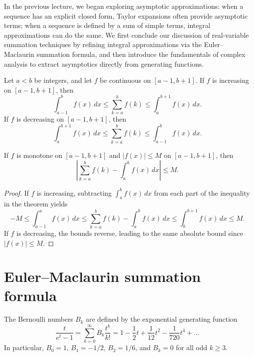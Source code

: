 
In the previous lecture, we began exploring asymptotic approximations:
when a sequence has an explicit closed form, Taylor expansions often provide asymptotic terms;
when a sequence is defined by a sum of simple terms, integral approximations can do the same.
We first conclude our discussion of real-variable summation techniques by refining integral approximations via the Euler--Maclaurin summation formula, and then introduce the fundamentals of complex analysis to extract asymptotics directly from generating functions.

\begin{theorem}
    Let \(a < b\) be integers, and let \(f\) be continuous on \([a-1, b+1]\).
    If \(f\) is increasing on \([a-1, b+1]\), then
    \[
        \int_{a-1}^{b} f(x) \, dx \le \sum_{k=a}^{b} f(k) \le \int_{a}^{b+1} f(x) \, dx.
    \]
    If \(f\) is decreasing on \([a-1, b+1]\), then
    \[
        \int_{a}^{b+1} f(x) \, dx \le \sum_{k=a}^{b} f(k) \le \int_{a-1}^{b} f(x) \, dx.
    \]
\end{theorem}

\begin{corollary}
    If \(f\) is monotone on \([a-1, b+1]\) and \(|f(x)| \le M\) on \([a-1, b+1]\), then
    \[
        \left| \sum_{k=a}^{b} f(k) - \int_{a}^{b} f(x) \, dx \right| \le M.
    \]
\end{corollary}

\begin{proof}
    If \(f\) is increasing, subtracting \(\int_a^b f(x) \, dx\) from each part of the inequality in the theorem yields
    \[
        -M \le \int_{a-1}^{a} f(x) \, dx \le \sum_{k=a}^{b} f(k) - \int_{a}^{b} f(x) \, dx \le \int_{b}^{b+1} f(x) \, dx \le M.
    \]
    If \(f\) is decreasing, the bounds reverse, leading to the same absolute bound since \(|f(x)| \le M\).
\end{proof}

\section*{Euler--Maclaurin summation formula}

The Bernoulli numbers \(B_k\) are defined by the exponential generating function
\[
    \frac{t}{e^t - 1} = \sum_{k=0}^{\infty} B_k \frac{t^k}{k!} = 1 - \frac{1}{2} t + \frac{1}{12} t^2 - \frac{1}{720} t^4 + \dots
\]
In particular, \(B_0 = 1\), \(B_1 = -1/2\), \(B_2 = 1/6\), and \(B_k = 0\) for all odd \(k \ge 3\).


